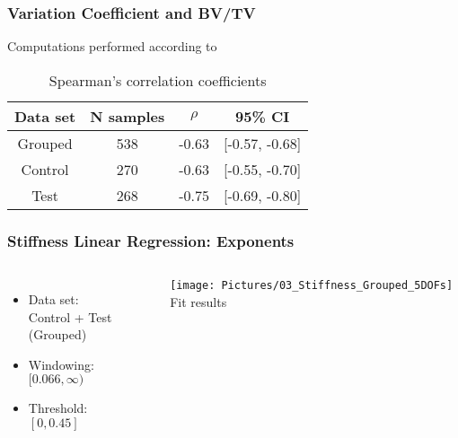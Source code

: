 \documentclass[xcolor=table]{beamer}
\begin{document}

\begin{frame}
	\frametitle{Variation Coefficient and BV/TV}
	Computations performed according to \cite{p2}
	\begin{table}[h!]
	\centering
	\caption{Spearman's correlation coefficients}\label{}
		\begin{tabular}{cccc}
			\toprule
			Data set & N samples & $\rho$ & 95\% CI \\
			\midrule
			Grouped & 538 & -0.63 & [-0.57, -0.68] \\
			Control & 270 & -0.63 & [-0.55, -0.70] \\
			Test & 268 & -0.75 & [-0.69, -0.80] \\
			\bottomrule
		\end{tabular}
	\end{table}
\end{frame}


\begin{frame}
	\frametitle{Stiffness Linear Regression: Exponents}
	\begin{columns}[c]
		\begin{itemize}[label=$\bullet$]
			\item Data set:\\
			Control + Test (Grouped)
			\item Windowing:\\
			$[0.066,\infty)$
			\item Threshold:\\
			$[0,0.45]$
		\end{itemize}
		\centering
		\vfill
		\texttt{[image: Pictures/03\_Stiffness\_Grouped\_5DOFs]}
		Fit results
		\vfill
	\end{columns}
\end{frame}

\end{document}
